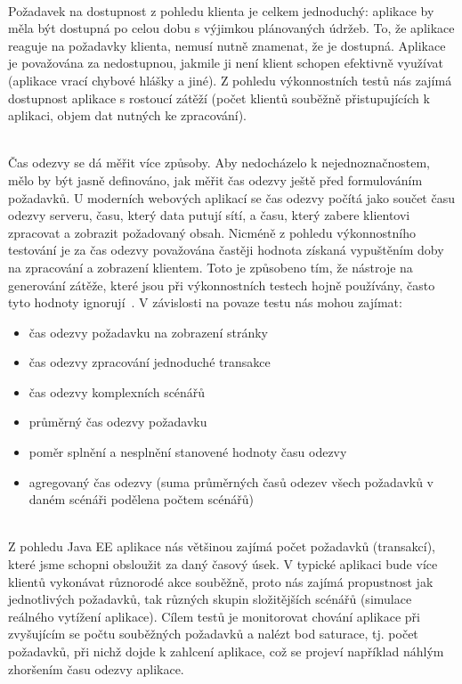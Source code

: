 \documentclass[122pt,oneside]{fithesis}
\begin{document}
\vspace{5 mm}
\\\indent Požadavek na dostupnost z pohledu klienta je celkem jednoduchý: aplikace by měla být dostupná po celou dobu s výjimkou plánovaných údržeb. To, že aplikace reaguje na požadavky klienta, nemusí nutně znamenat, že je dostupná. Aplikace je považována za nedostupnou, jakmile ji není klient schopen efektivně využívat (aplikace vrací chybové hlášky a jiné).
Z pohledu výkonnostních testů nás zajímá dostupnost aplikace s rostoucí zátěží (počet klientů souběžně přistupujících k aplikaci, objem dat nutných ke zpracování). 

\vspace{5 mm}
\\\indent Čas odezvy se dá měřit více způsoby. Aby nedocházelo k nejednoznačnostem, mělo by být jasně definováno, jak měřit čas odezvy ještě před formulováním požadavků. U moderních webových aplikací se čas odezvy počítá jako součet času odezvy serveru, času, který data putují sítí, a času, který zabere klientovi zpracovat a zobrazit požadovaný obsah. Nicméně z pohledu výkonnostního testování je za čas odezvy považována častěji hodnota získaná vypuštěním doby na zpracování a zobrazení klientem. Toto je způsobeno tím, že nástroje na generování zátěže, které jsou při výkonnostních testech hojně používány, často tyto hodnoty ignorují~\cite{moorthy09}.
V závislosti na povaze testu nás mohou zajímat:
\begin{itemize}
  \item čas odezvy požadavku na zobrazení stránky
  \item čas odezvy zpracování jednoduché transakce
  \item čas odezvy komplexních scénářů
  \item průměrný čas odezvy požadavku
  \item poměr splnění a nesplnění stanovené hodnoty času odezvy
  \item agregovaný čas odezvy (suma průměrných časů odezev všech požadavků v daném scénáři podělena počtem scénářů)
\end{itemize}


\vspace{5 mm}
\\\indent Z pohledu Java EE aplikace nás většinou zajímá počet požadavků (transakcí), které jsme schopni obsloužit za daný časový úsek. V typické aplikaci bude více klientů vykonávat různorodé akce souběžně, proto nás zajímá propustnost jak jednotlivých požadavků, tak různých skupin složitějších scénářů (simulace reálného vytížení aplikace). Cílem testů je monitorovat chování aplikace při zvyšujícím se počtu souběžných požadavků a nalézt bod saturace, tj. počet požadavků, při nichž dojde k zahlcení aplikace, což se projeví například náhlým zhoršením času odezvy aplikace. 
\end{document}
